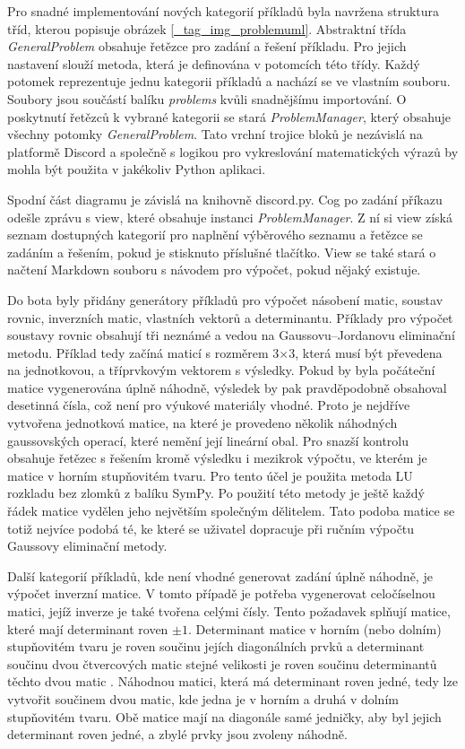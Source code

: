 \documentclass[FM]{tulthesis}
\begin{document}
	Pro snadné implementování nových kategorií příkladů byla navržena struktura tříd, kterou popisuje obrázek \ref{_tag_img_problemuml}. Abstraktní třída \textit{GeneralProblem} obsahuje řetězce pro zadání a řešení příkladu. Pro jejich nastavení slouží metoda, která je definována v potomcích této třídy. Každý potomek reprezentuje jednu kategorii příkladů a nachází se ve vlastním souboru. Soubory jsou součástí balíku \textit{problems} kvůli snadnějšímu importování. O poskytnutí řetězců k vybrané kategorii se stará \mbox{\textit{ProblemManager}}, který obsahuje všechny potomky \textit{GeneralProblem}. Tato vrchní trojice bloků je nezávislá na platformě Discord a společně s logikou pro vykreslování matematických výrazů by mohla být použita v jakékoliv Python aplikaci.
	
	Spodní část diagramu je závislá na knihovně discord.py. Cog po zadání příkazu odešle zprávu s view, které obsahuje instanci \textit{ProblemManager}. Z ní si view získá seznam dostupných kategorií pro naplnění výběrového seznamu a řetězce se zadáním a řešením, pokud je stisknuto příslušné tlačítko. View se také stará o načtení Markdown souboru s návodem pro výpočet, pokud nějaký existuje.
	
	Do bota byly přidány generátory příkladů pro výpočet násobení matic, soustav rovnic, inverzních matic, vlastních vektorů a determinantu. Příklady pro výpočet soustavy rovnic obsahují tři neznámé a vedou na Gaussovu–Jordanovu eliminační metodu. Příklad tedy začíná maticí s rozměrem 3$\times$3, která musí být převedena na jednotkovou, a tříprvkovým vektorem s výsledky. Pokud by byla počáteční matice vygenerována úplně náhodně, výsledek by pak pravděpodobně obsahoval desetinná čísla, což není pro výukové materiály vhodné. Proto je nejdříve vytvořena jednotková matice, na které je provedeno několik náhodných gaussovských operací, které nemění její lineární obal. Pro snazší kontrolu obsahuje řetězec s řešením kromě výsledku i mezikrok výpočtu, ve kterém je matice v horním stupňovitém tvaru. Pro tento účel je použita metoda LU rozkladu bez zlomků z balíku SymPy. Po použití této metody je ještě každý řádek matice vydělen jeho největším společným dělitelem. Tato podoba matice se totiž nejvíce podobá té, ke které se uživatel dopracuje při ručním výpočtu Gaussovy eliminační metody.
	
	Další kategorií příkladů, kde není vhodné generovat zadání úplně náhodně, je výpočet inverzní matice. V tomto případě je potřeba vygenerovat celočíselnou matici, jejíž inverze je také tvořena celými čísly. Tento požadavek splňují matice, které mají determinant roven $\pm1$. Determinant matice v horním (nebo dolním) stupňovitém tvaru je roven součinu jejích diagonálních prvků a determinant součinu dvou čtvercových matic stejné velikosti je roven součinu determinantů těchto dvou matic \cite{lit_lingebra}. Náhodnou matici, která má determinant roven jedné, tedy lze vytvořit součinem dvou matic, kde jedna je v horním a druhá v dolním stupňovitém tvaru. Obě matice mají na diagonále samé jedničky, aby byl jejich determinant roven jedné, a zbylé prvky jsou zvoleny náhodně.
	
\end{document}
